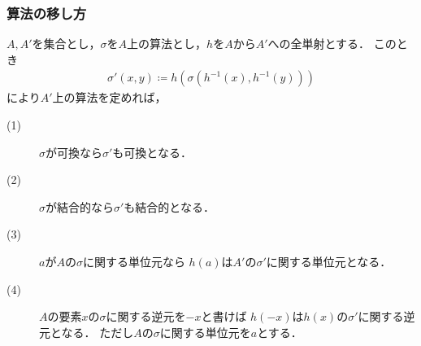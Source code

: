\subsubsection{算法の移し方}
	$A,A'$を集合とし，$\sigma$を$A$上の算法とし，$h$を$A$から$A'$への全単射とする．
	このとき
	\begin{align}
		\sigma'(x,y) \coloneqq h\left(\sigma(h^{-1}(x),h^{-1}(y))\right)
	\end{align}
	により$A'$上の算法を定めれば，
	\begin{description}
		\item[(1)] $\sigma$が可換なら$\sigma'$も可換となる．
		\item[(2)] $\sigma$が結合的なら$\sigma'$も結合的となる．
		\item[(3)] $a$が$A$の$\sigma$に関する単位元なら
			$h(a)$は$A'$の$\sigma'$に関する単位元となる．
		\item[(4)] $A$の要素$x$の$\sigma$に関する逆元を$-x$と書けば
			$h(-x)$は$h(x)$の$\sigma'$に関する逆元となる．
			ただし$A$の$\sigma$に関する単位元を$a$とする．
	\end{description}
	
